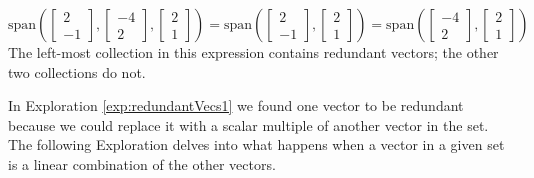 \documentclass{ximera}
\begin{document}
$$\mbox{span}\left(\begin{bmatrix}2\\-1\end{bmatrix}, \begin{bmatrix}-4\\2\end{bmatrix}, \begin{bmatrix}2\\1\end{bmatrix}\right)=\mbox{span}\left(\begin{bmatrix}2\\-1\end{bmatrix}, \begin{bmatrix}2\\1\end{bmatrix}\right)=\mbox{span}\left(\begin{bmatrix}-4\\2\end{bmatrix}, \begin{bmatrix}2\\1\end{bmatrix}\right)$$
The left-most collection in this expression contains redundant vectors; the other two collections do not.

In Exploration \ref{exp:redundantVecs1} we found one vector to be redundant because we could replace it with a scalar multiple of another vector in the set.  The following Exploration delves into what happens when a vector in a given set is a linear combination of the other vectors.
\end{document}
